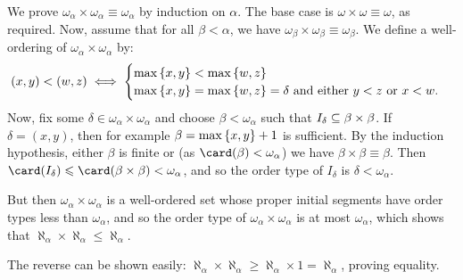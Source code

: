 \documentclass{article}
\begin{document}
\begin{prf}
    We prove $\omega_\alpha \times \omega_\alpha \equiv \omega_\alpha$ by induction on $\alpha$. The base case is $\omega \times \omega \equiv \omega$, as required. Now, assume that for all $\beta < \alpha$, we have $\omega_\beta \times \omega_\beta \equiv \omega_\beta$. We define a well-ordering of $\omega_\alpha \times \omega_\alpha$ by:
    \[
	(x, y) < (w, z) \iff \begin{cases}
		\max \left\lbrace x, y \right\rbrace < \max \left\lbrace w, z \right\rbrace \\
		\max \left\lbrace x, y \right\rbrace = \max \left\lbrace w, z \right\rbrace = \delta
		\text{ and either $y < z$ or $x < w$}.
	\end{cases}
	\]
	Now, fix some $\delta \in \omega_\alpha \times \omega_\alpha$ and choose $\beta < \omega_\alpha$ such that $I_\delta \subseteq \beta \times \beta$. If $\delta = (x, y)$, then for example $\beta = \max \left\lbrace x, y \right\rbrace + 1$ is sufficient. By the induction hypothesis, either $\beta$ is finite or (as $\card(\beta) < \omega_\alpha$) we have $\beta \times \beta \equiv \beta$. Then $\card(I_\delta) \leq \card(\beta \times \beta) < \omega_\alpha$, and so the order type of $I_\delta$ is $\delta < \omega_\alpha$.
	
	But then $\omega_\alpha \times \omega_\alpha$ is a well-ordered set whose proper initial segments have order types less than $\omega_\alpha$, and so the order type of $\omega_\alpha \times \omega_\alpha$ is at most $\omega_\alpha$, which shows that $\aleph_\alpha \times \aleph_\alpha \leq \aleph_\alpha$.
	
	The reverse can be shown easily: $\aleph_\alpha \times \aleph_\alpha \geq  \aleph_\alpha \times 1 = \aleph_\alpha$, proving equality.
\end{prf}
\end{document}
